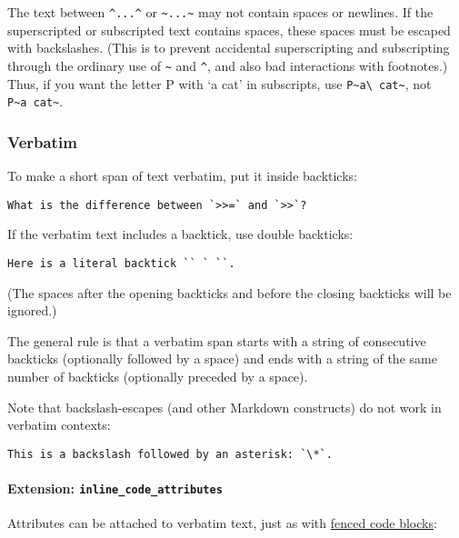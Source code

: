 \documentclass[
]{article}
\begin{document}
The text between \texttt{\^{}...\^{}} or
\texttt{\textasciitilde{}...\textasciitilde{}} may not contain spaces or
newlines. If the superscripted or subscripted text contains spaces,
these spaces must be escaped with backslashes. (This is to prevent
accidental superscripting and subscripting through the ordinary use of
\texttt{\textasciitilde{}} and \texttt{\^{}}, and also bad interactions
with footnotes.) Thus, if you want the letter P with `a cat' in
subscripts, use
\texttt{P\textasciitilde{}a\textbackslash{}\ cat\textasciitilde{}}, not
\texttt{P\textasciitilde{}a\ cat\textasciitilde{}}.

\subsubsection{Verbatim}\label{verbatim}

To make a short span of text verbatim, put it inside backticks:

\begin{verbatim}
What is the difference between `>>=` and `>>`?
\end{verbatim}

If the verbatim text includes a backtick, use double backticks:

\begin{verbatim}
Here is a literal backtick `` ` ``.
\end{verbatim}

(The spaces after the opening backticks and before the closing backticks
will be ignored.)

The general rule is that a verbatim span starts with a string of
consecutive backticks (optionally followed by a space) and ends with a
string of the same number of backticks (optionally preceded by a space).

Note that backslash-escapes (and other Markdown constructs) do not work
in verbatim contexts:

\begin{verbatim}
This is a backslash followed by an asterisk: `\*`.
\end{verbatim}

\paragraph{\texorpdfstring{Extension:
\texttt{inline\_code\_attributes}}{Extension: inline\_code\_attributes}}\label{extension-inline_code_attributes}

Attributes can be attached to verbatim text, just as with
\hyperref[fenced-code-blocks]{fenced code blocks}:
\end{document}
